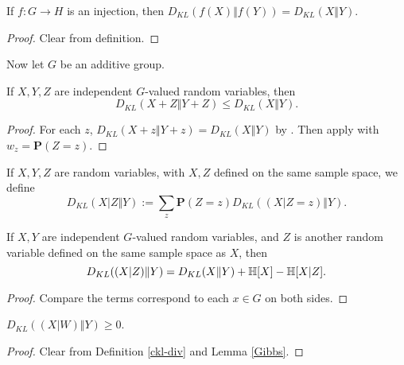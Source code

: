 \begin{lemma}\label{kl-div-inj}  If $f:G \to H$ is an injection, then $D_{KL}(f(X)\Vert f(Y)) = D_{KL}(X\Vert Y)$.
\end{lemma}

\begin{proof} Clear from definition.
\end{proof}

Now let $G$ be an additive group.

\begin{lemma}\label{kl-sums} If $X, Y, Z$ are independent $G$-valued random variables, then
  $$D_{KL}(X+Z\Vert Y+Z) \leq D_{KL}(X\Vert Y).$$
\end{lemma}

\begin{proof}
For each $z$, $D_{KL}(X+z\Vert Y+z)=D_{KL}(X\Vert Y)$ by . Then apply  with $w_z=\mathbf{P}(Z=z)$.
\end{proof}

\begin{definition}\label{ckl-div}  
  If $X,Y,Z$ are random variables, with $X,Z$ defined on the same sample space, we define
$$ D_{KL}(X|Z \Vert  Y) := \sum_z \mathbf{P}(Z=z) D_{KL}( (X|Z=z) \Vert  Y).$$
\end{definition}

\begin{lemma}\label{kl-cond} If $X, Y$ are independent $G$-valued random variables, and $Z$ is another random variable defined on the same sample space as $X$, then
  $$D_{KL}((X|Z)\Vert Y) = D_{KL}(X\Vert Y) + \mathbb{H}[X] - \mathbb{H}[X|Z].$$
\end{lemma}

\begin{proof} 
   Compare the terms correspond to each $x\in G$ on both sides.
\end{proof}

\begin{lemma}\label{Conditional-Gibbs}  $D_{KL}((X|W)\Vert Y) \geq 0$.
\end{lemma}

\begin{proof}  Clear from Definition \ref{ckl-div} and Lemma \ref{Gibbs}.
\end{proof}

